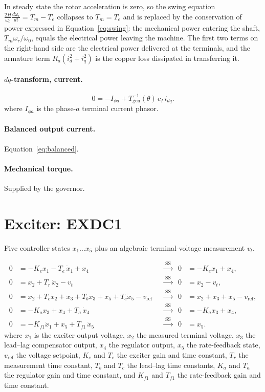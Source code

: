 \documentclass[11pt]{article}
\newcommand{\wnom}{\omega_0}
\newcommand{\wrot}{\omega_r}
\begin{document}
In steady state the rotor acceleration is zero, so the swing equation
$\tfrac{2H}{\wnom}\tfrac{d\wrot}{dt} = T_m - T_e$ collapses to
$T_m = T_e$ and is replaced by the conservation of power expressed in
Equation~\eqref{eq:swing}: the mechanical power entering the shaft,
$T_m\wrot/\wnom$, equals the electrical power leaving the machine. The
first two terms on the right-hand side are the electrical power delivered
at the terminals, and the armature term $R_a(i_d^2+i_q^2)$ is the copper
loss dissipated in transferring it.

\paragraph{$dq$-transform, current.}
\begin{equation}
  0 = -I_{\phi a} + T_{\text{gen}}^{-1}(\theta)\,c_I\, i_{dq}.
\end{equation}
where $I_{\phi a}$ is the phase-$a$ terminal current phasor.

\paragraph{Balanced output current.}
Equation~\eqref{eq:balanced}.

\paragraph{Mechanical torque.}
Supplied by the governor.

\section{Exciter: EXDC1}

Five controller states $x_1\ldots x_5$ plus an algebraic terminal-voltage
measurement $v_t$.

\begin{align}
  0 &= -K_e x_1 - T_e\,\dot{x}_1 + x_4
     &&\xrightarrow{\;\text{SS}\;}& 0 &= -K_e x_1 + x_4, \\
  0 &= x_2 + T_r\,\dot{x}_2 - v_t
     &&\xrightarrow{\;\text{SS}\;}& 0 &= x_2 - v_t, \\
  0 &= x_2 + T_c\dot{x}_2 + x_3 + T_b\dot{x}_3 + x_5 + T_c\dot{x}_5 - v_{\text{ref}}
     &&\xrightarrow{\;\text{SS}\;}& 0 &= x_2 + x_3 + x_5 - v_{\text{ref}}, \\
  0 &= -K_a x_3 + x_4 + T_a\,\dot{x}_4
     &&\xrightarrow{\;\text{SS}\;}& 0 &= -K_a x_3 + x_4, \\
  0 &= -K_{f1}\dot{x}_1 + x_5 + T_{f1}\,\dot{x}_5
     &&\xrightarrow{\;\text{SS}\;}& 0 &= x_5 .
\end{align}
where $x_1$ is the exciter output voltage, $x_2$ the measured terminal
voltage, $x_3$ the lead--lag compensator output, $x_4$ the regulator
output, $x_5$ the rate-feedback state, $v_{\text{ref}}$ the voltage
setpoint, $K_e$ and $T_e$ the exciter gain and time constant, $T_r$ the
measurement time constant, $T_b$ and $T_c$ the lead--lag time constants,
$K_a$ and $T_a$ the regulator gain and time constant, and $K_{f1}$ and
$T_{f1}$ the rate-feedback gain and time constant.
\end{document}
